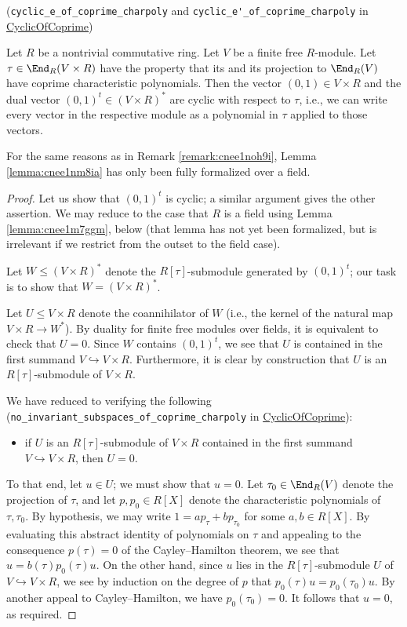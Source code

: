 \documentclass[reqno]{amsart} 
\begin{document}
\begin{lemma}\label{lemma:cnee1nm8ia}
  (\verb|cyclic_e_of_coprime_charpoly| and \verb|cyclic_e'_of_coprime_charpoly| in \href{CyclicOfCoprime.lean}{CyclicOfCoprime})

  Let $R$ be a nontrivial commutative ring.  Let $V$ be a finite free $R$-module.  Let $\tau \in \End_R(V \times R)$ have the property that its and its projection to $\End_R(V)$ have coprime characteristic polynomials.  Then the vector $(0,1) \in V \times R$ and the dual vector $(0,1)^t \in (V \times R)^*$ are cyclic with respect to $\tau$, i.e., we can write every vector in the respective module as a polynomial in $\tau$ applied to those vectors.
\end{lemma}
\begin{remark}
  For the same reasons as in Remark \ref{remark:cnee1noh9i}, Lemma \ref{lemma:cnee1nm8ia} has only been fully formalized over a field.
\end{remark}
\begin{proof}
  Let us show that $(0,1)^t$ is cyclic; a similar argument gives the other assertion.  We may reduce to the case that $R$ is a field using Lemma \ref{lemma:cnee1m7ggm}, below (that lemma has not yet been formalized, but is irrelevant if we restrict from the outset to the field case).

  Let $W \leq (V \times R)^*$ denote the $R[\tau]$-submodule generated by $(0,1)^t$; our task is to show that $W = (V \times R)^*$.

  Let $U \leq V \times R$ denote the coannihilator of $W$ (i.e., the kernel of the natural map $V \times R \rightarrow W^*$).  By duality for finite free modules over fields, it is equivalent to check that $U = 0$.  Since $W$ contains $(0,1)^t$, we see that $U$ is contained in the first summand $V \hookrightarrow V \times R$.  Furthermore, it is clear by construction that $U$ is an $R[\tau]$-submodule of $V \times R$.

  We have reduced to verifying the following (\verb|no_invariant_subspaces_of_coprime_charpoly| in \href{CyclicOfCoprime.lean}{CyclicOfCoprime}):
  \begin{itemize}
  \item if $U$ is an $R[\tau]$-submodule of $V \times R$ contained in the first summand $V \hookrightarrow V \times R$, then $U = 0$.
  \end{itemize}

  To that end, let $u \in U$; we must show that $u = 0$.  Let $\tau_0 \in \End_R(V)$ denote the projection of $\tau$, and let $p, p_0 \in R[X]$ denote the characteristic polynomials of $\tau, \tau_0$.  By hypothesis, we may write $1 = a p_\tau + b p_{\tau_0}$ for some $a, b \in R[X]$.  By evaluating this abstract identity of polynomials on $\tau$ and appealing to the consequence $p(\tau) = 0$ of the Cayley--Hamilton theorem, we see that $u = b(\tau) p_0(\tau) u$.  On the other hand, since $u$ lies in the $R[\tau]$-submodule $U$ of $V \hookrightarrow V \times R$, we see by induction on the degree of $p$ that $p_0(\tau) u = p_0(\tau_0) u$.  By another appeal to Cayley--Hamilton, we have $p_0(\tau_0) = 0$.  It follows that $u = 0$, as required.
\end{proof}
\end{document}

